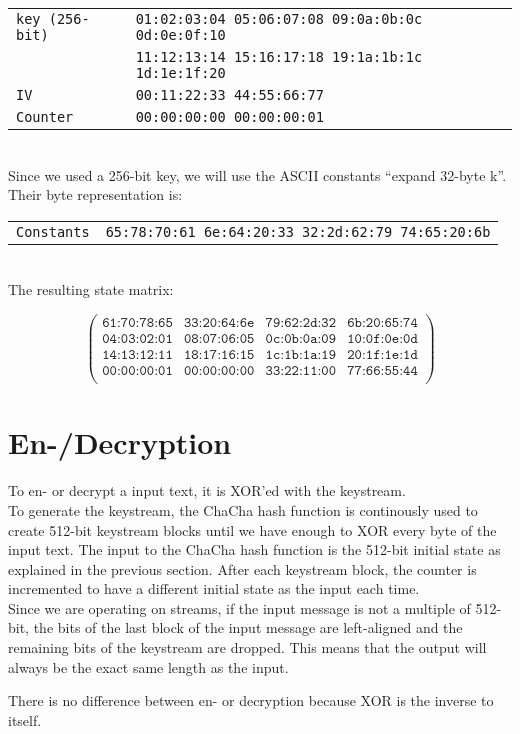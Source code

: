 \begin{tabular}{ l l }
 \texttt{key (256-bit)} & \texttt{01:02:03:04 05:06:07:08 09:0a:0b:0c 0d:0e:0f:10} \\ 
 & \texttt{11:12:13:14 15:16:17:18 19:1a:1b:1c 1d:1e:1f:20}\\
 \texttt{IV} & \texttt{00:11:22:33 44:55:66:77} \\  
\texttt{Counter} & \texttt{00:00:00:00 00:00:00:01} \\
\end{tabular}
\\

\noindent Since we used a 256-bit key, we will use the ASCII constants ``expand 32-byte k''. Their byte representation is:\\

\begin{tabular}{ l l }
\texttt{Constants} & \texttt{65:78:70:61 6e:64:20:33 32:2d:62:79 74:65:20:6b} \\
\end{tabular}
\\

\noindent The resulting state matrix:

\begin{equation*}
\begin{pmatrix}
\texttt{61:70:78:65}& \texttt{33:20:64:6e} & \texttt{79:62:2d:32} & \texttt{6b:20:65:74} \\
\texttt{04:03:02:01} & \texttt{08:07:06:05} & \texttt{0c:0b:0a:09} & \texttt{10:0f:0e:0d} \\
\texttt{14:13:12:11} & \texttt{18:17:16:15} & \texttt{1c:1b:1a:19} & \texttt{20:1f:1e:1d} \\
\texttt{00:00:00:01} & \texttt{00:00:00:00} & \texttt{33:22:11:00} & \texttt{77:66:55:44} \\
\end{pmatrix}
\end{equation*}

\section{En-/Decryption}
\label{sec:chacha.encryption}

To en- or decrypt a input text, it is XOR'ed with the keystream. \\
To generate the keystream, the ChaCha hash function is continously used to create 512-bit keystream blocks until we have enough to XOR every byte of the input text. The input to the ChaCha hash function is the 512-bit initial state as explained in the previous section. After each keystream block, the counter is incremented to have a different initial state as the input each time. \\
Since we are operating on streams, if the input message is not a multiple of 512-bit, the bits of the last block of the input message are left-aligned and the remaining bits of the keystream are dropped. This means that the output will always be the exact same length as the input.

There is no difference between en- or decryption because XOR is the inverse to itself.
